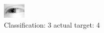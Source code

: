 \begin{figure}[h!]
\begin{center}
\includegraphics[width=0.60\columnwidth]{figures/ID2546_class_3_target_4.png}
\end{center}
\caption{ Classification: 3 actual target: 4}
\label{fig:ID2546_class_3_target_4}
\end{figure}

